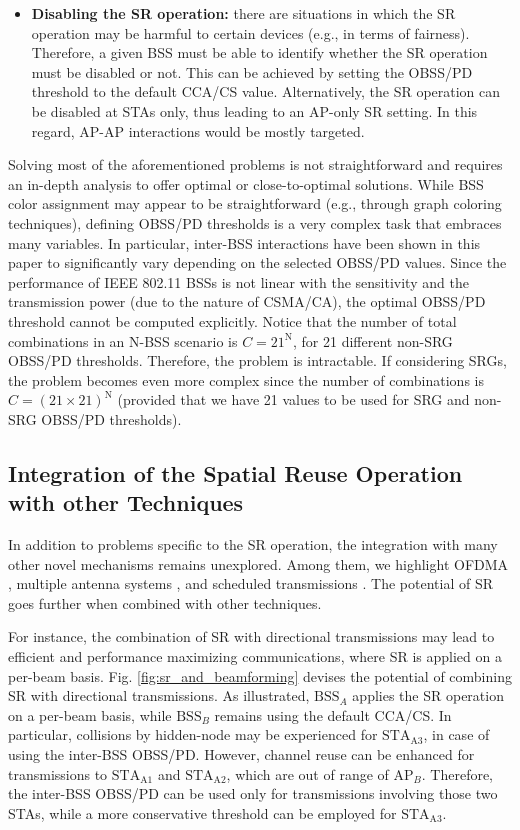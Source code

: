 \documentclass{ieeeaccess}
\begin{document}
\begin{itemize}
	\item \textbf{Disabling the SR operation:} there are situations in which the SR operation may be harmful to certain devices (e.g., in terms of fairness). Therefore, a given BSS must be able to identify whether the SR operation must be disabled or not. This can be achieved by setting the OBSS/PD threshold to the default CCA/CS value. Alternatively, the SR operation can be disabled at STAs only, thus leading to an AP-only SR setting. In this regard, AP-AP interactions would be mostly targeted.
\end{itemize}

Solving most of the aforementioned problems is not straightforward and requires an in-depth analysis to offer optimal or close-to-optimal solutions. While BSS color assignment may appear to be straightforward (e.g., through graph coloring techniques), defining OBSS/PD thresholds is a very complex task that embraces many variables. In particular, inter-BSS interactions have been shown in this paper to significantly vary depending on the selected OBSS/PD values. Since the performance of IEEE 802.11 BSSs is not linear with the sensitivity and the transmission power (due to the nature of CSMA/CA), the optimal OBSS/PD threshold cannot be computed explicitly. Notice that the number of total combinations in an N-BSS scenario is $C = 21^\text{N}$, for 21 different non-SRG OBSS/PD thresholds. Therefore, the problem is intractable. If considering SRGs, the problem becomes even more complex since the number of combinations is $C = (21\times21)^\text{N}$ (provided that we have 21 values to be used for SRG and non-SRG OBSS/PD thresholds).

\subsection{Integration of the Spatial Reuse Operation with other Techniques}

In addition to problems specific to the SR operation, the integration with many other novel mechanisms remains unexplored. Among them, we highlight OFDMA \cite{bankov2018ofdma, dovelos2018optimal}, multiple antenna systems \cite{liao2016mu}, and scheduled transmissions \cite{nurchis2019target}. The potential of SR goes further when combined with other techniques. 

For instance, the combination of SR with directional transmissions may lead to efficient and performance maximizing communications, where SR is applied on a per-beam basis. Fig. \ref{fig:sr_and_beamforming} devises the potential of combining SR with directional transmissions. As illustrated, $\text{BSS}_A$ applies the SR operation on a per-beam basis, while $\text{BSS}_B$ remains using the default CCA/CS. In particular, collisions by hidden-node may be experienced for $\text{STA}_\text{A3}$, in case of using the inter-BSS OBSS/PD. However, channel reuse can be enhanced for transmissions to $\text{STA}_\text{A1}$ and $\text{STA}_\text{A2}$, which are out of range of $\text{AP}_B$. Therefore, the inter-BSS OBSS/PD can be used only for transmissions involving those two STAs, while a more conservative threshold can be employed for $\text{STA}_\text{A3}$.
\end{document}
